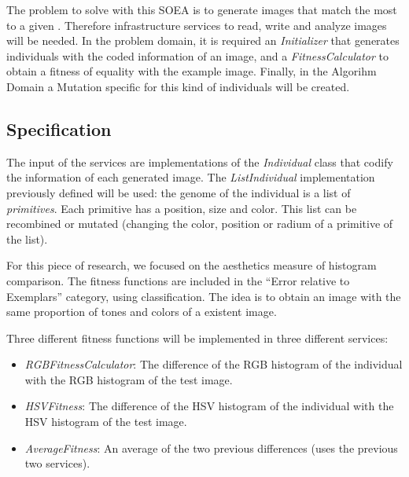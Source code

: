 The problem to solve with this SOEA is to generate images that match the most to a given . Therefore infrastructure services to read, write and analyze images will be needed. In the problem domain, it is required an {\em Initializer} that generates individuals with the coded information of an image, and a {\em FitnessCalculator} to obtain a fitness of equality with the example image. Finally, in the Algorihm Domain a Mutation specific for this kind of individuals will be created. 



\subsection{Specification}

The input of the services are implementations of the {\em Individual} class that codify the information of each generated image. The {\em ListIndividual}   implementation previously defined will be used: the genome of the individual is a list of
{\em primitives}. %
Each primitive has a position, size and color. This list can
be recombined or mutated (changing the color, position or radium of a
primitive of the list). 




For this piece of research, we focused on the aesthetics measure of
histogram comparison. The fitness functions are included in the
``Error relative to Exemplars'' category, using 
\cite{galanter2012computational} classification. The idea is to obtain
an image with the same proportion of tones and colors of a 
existent image. 


Three different fitness functions will be implemented in three different services:
\begin{itemize}
\item {\em RGBFitnessCalculator}: The difference of the RGB histogram of the individual with the RGB histogram of the test image.
\item {\em HSVFitness}: The difference of the HSV histogram of the individual with the HSV histogram of the test image.
\item {\em AverageFitness}: An average of the two previous differences (uses the previous two services).
\end{itemize}

